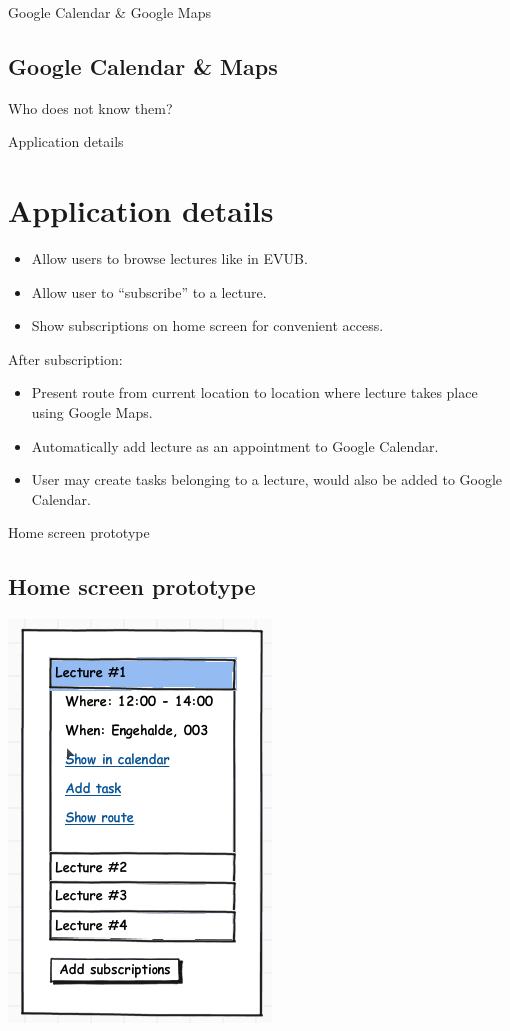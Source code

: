 \documentclass{beamer}
\begin{document}
\begin{frame}{Google Calendar \& Google Maps}
	\subsection{Google Calendar \& Maps}
	Who does not know them?
\end{frame}

\begin{frame}{Application details}
	\section{Application details}

	\begin{itemize}
		\item Allow users to browse lectures like in EVUB.
		\item Allow user to ``subscribe'' to a lecture.
		\item Show subscriptions on home screen for convenient access.
	\end{itemize}

	After subscription:
	\begin{itemize}
		\item Present route from current location to location where lecture takes place using Google Maps.
		\item Automatically add lecture as an appointment to Google Calendar.
		\item User may create tasks belonging to a lecture, would also be added to Google Calendar.
	\end{itemize}
	
\end{frame}

\begin{frame}{Home screen prototype}
	\subsection{Home screen prototype}
	
	\begin{center}
		\includegraphics[scale=0.5]{home.png}
	\end{center}

\end{frame}
\end{document}
